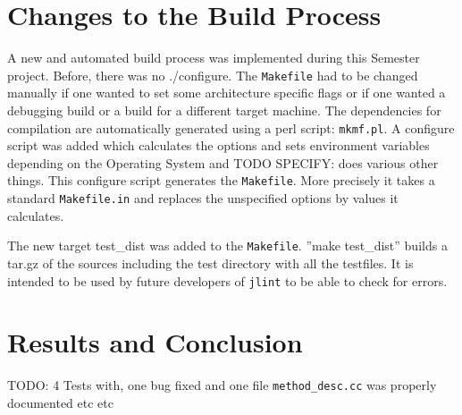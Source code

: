 \documentclass[11pt,twoside,a4paper,draft]{article}
\begin{document}
\section {Changes to the Build Process}

A new and automated build process was implemented during this Semester project.
Before, there was no ./configure. The \texttt{Makefile} had to be changed
manually if one wanted to set some architecture specific flags or if one wanted
a debugging build or a build for a different target machine. The dependencies 
for compilation are automatically generated using a perl script: 
\texttt{mkmf.pl}. A configure script was added which calculates the options 
and sets environment variables depending on the Operating System and TODO 
SPECIFY: does various other things. This configure script generates the 
\texttt{Makefile}. More precisely it takes a standard \texttt{Makefile.in} 
and replaces the unspecified options by values it calculates.

The new target test\_dist was added to the \texttt{Makefile}. 
''make test\_dist'' builds a tar.gz of the sources including the test 
directory with all the testfiles. It is intended to be used by future 
developers of \texttt{jlint} to be able to check for errors.

\section {Results and Conclusion}

TODO: 4 Tests with, one bug fixed and one file 
\texttt{method\_desc.cc} was properly documented etc etc
\end{document}
